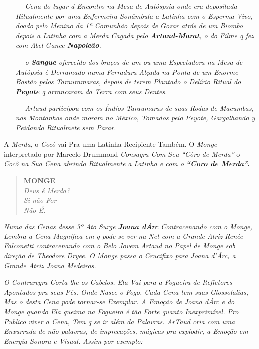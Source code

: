 \begin{itemize}
\item[---] \emph{Cena do lugar d Encontro na Mesa de Autóspsia onde era depositada
Ritualmente por uma Enfermeira Sonâmbula a Latinha com o Esperma Vivo,
doado pelo Menino da 1ª Comunhão depois de Gozar atrás de um Biombo
depois a Latinha com a Merda Cagada pelo \textbf{Artaud-Marat}, o do
Filme q fez com Abel Gance \textbf{Napoleão}.}

\item[---] \emph{o \textbf{Sangue} oferecido dos braços de um ou uma Espectadora
  na Mesa de Autópsia é Derramado numa Ferradura Alçada na Ponta de um
  Enorme Bastão pelos Tarauramaras, depois de terem Plantado o Delírio
  Ritual do \textbf{Peyote} q arrancaram da Terra com seus Dentes.}

\item[---] \emph{Artaud participou com os Índios Taraumaras de suas Rodas de
  Macumbas, nas Montanhas onde moram no México, Tomados pelo Peyote,
  Gargalhando y Peidando Ritualmete sem Parar.}
\end{itemize}

A \emph{Merda}, o \emph{Cocô} vai Pra uma Latinha Recipiente Também. O
\emph{Monge} interpretado por Marcelo Drummond \emph{Consagra Com Seu
``Côro de Merda''} o \emph{Cocô na Sua Cena abrindo Ritualmente a
Latinha e com o \textbf{``Coro de Merda''.}}

\begin{verse}
\textbf{MONGE}\\
\emph{Deus é Merda?}\\
\emph{Si não For}\\
\emph{Não É.}
\end{verse}

\noindent\dotfill
\bigskip

\noindent\emph{Numa das Cenas desse 3º Ato Surge \textbf{Joana dÁrc}
Contracenando com o Monge, Lembra a Cena Magnifica em q pode se ver na
Net com a Grande Atriz Renée Falconetti contracenando com o Belo Jovem
Artaud no Papel de Monge sob direção de Theodore Dryee. O Monge passa o
Crucifixo para Joana d'Árc, a Grande Atriz Joana Medeiros.}

\emph{O Contraregra Corta-lhe os Cabelos. Ela Vai para a Fogueira de
Refletores Apontados pra seus Pés. Onde Nasce o Fogo. Cada Cena tem suas
Glossolalías, Mas o desta Cena pode tornar-se Exemplar. A Emoção de
Joana dÁrc e do Monge quando Ela queima na Fogueira é tão Forte quanto
Inexprimível. Pro Publico viver a Cena, Tem q se ir além da Palavras.
ArTaud cria com uma Enxurrada de não palavras, de imprecações, mágicas
pra explodir, a Emoção em Energía Sonora e Visual. Assim por exemplo:}

